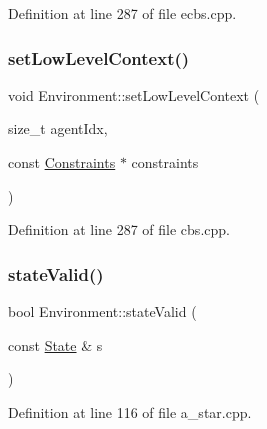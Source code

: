 Definition at line 287 of file ecbs.\+cpp.

\mbox{\label{class_environment_a56b6dff6d3af3fe6404936a14a259c56}} 
\subsubsection{\texorpdfstring{set\+Low\+Level\+Context()}{setLowLevelContext()}\hspace{0.1cm}{\footnotesize\ttfamily [2/2]}}
{\footnotesize\ttfamily void Environment\+::set\+Low\+Level\+Context (\begin{DoxyParamCaption}\item[{size\+\_\+t}]{agent\+Idx,  }\item[{const \hyperlink{struct_constraints}{Constraints} $\ast$}]{constraints }\end{DoxyParamCaption})\hspace{0.3cm}{\ttfamily [inline]}}



Definition at line 287 of file cbs.\+cpp.

\mbox{\label{class_environment_ad21a790ab0279b0f5b445e1f460dc971}} 
\subsubsection{\texorpdfstring{state\+Valid()}{stateValid()}\hspace{0.1cm}{\footnotesize\ttfamily [1/2]}}
{\footnotesize\ttfamily bool Environment\+::state\+Valid (\begin{DoxyParamCaption}\item[{const \hyperlink{struct_state}{State} \&}]{s }\end{DoxyParamCaption})\hspace{0.3cm}{\ttfamily [inline]}}



Definition at line 116 of file a\+\_\+star.\+cpp.


